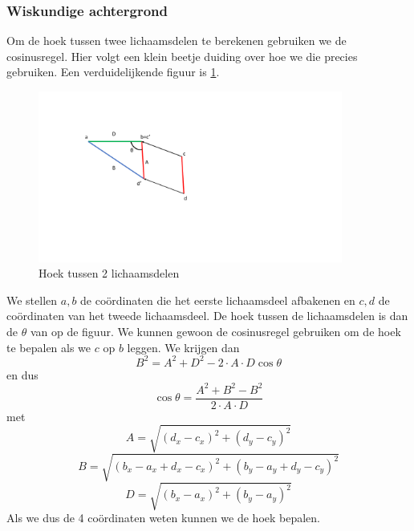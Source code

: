 \documentclass{article}
\begin{document}
\subsubsection{Wiskundige achtergrond}
Om de hoek tussen twee lichaamsdelen te berekenen gebruiken we de cosinusregel. Hier volgt een klein beetje duiding over hoe we die precies gebruiken. Een verduidelijkende figuur is \ref{cos}.\\
\begin{figure}
	\begin{center}
		\includegraphics[width=10cm]{cos.pdf}
	\end{center}
	\caption{Hoek tussen 2 lichaamsdelen}
	\label{cos}
\end{figure}
We stellen \(a, b\) de coördinaten die het eerste lichaamsdeel afbakenen en \(c, d\) de coördinaten van het tweede lichaamsdeel. De hoek tussen de lichaamsdelen is dan de \(\theta\) van op de figuur. We kunnen gewoon de cosinusregel gebruiken om de hoek te bepalen als we \(c\) op \(b\) leggen. We krijgen dan
\[B^2 = A^2 + D^2 -2\cdot A\cdot D\cos\theta\]
en dus
\[\cos\theta = \frac{A^2 + B^2 - B^2}{2\cdot A\cdot D}\]
met
\[A = \sqrt{(d_x - c_x)^2 + (d_y - c_y)^2}\]
\[B = \sqrt{(b_x - a_x + d_x - c_x)^2 + (b_y - a_y + d_y - c_y)^2}\]
\[D = \sqrt{(b_x - a_x)^2 + (b_y - a_y)^2}\]
Als we dus de 4 coördinaten weten kunnen we de hoek bepalen.
\end{document}
